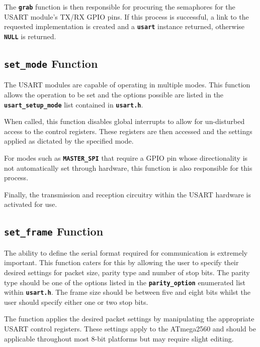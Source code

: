 \documentclass[a4paper, oneside, 11pt, titlepage, onecolumn, openright]{report}
\begin{document}
{{			The \textbf{\texttt{grab}} function is then responsible for procuring the semaphores for the USART module's TX/RX GPIO pins. If this process is successful, a link to the requested implementation is created and a \textbf{\texttt{usart}} instance returned, otherwise \textbf{\texttt{NULL}} is returned.
			
\subsection{\textbf{\texttt{set\_mode}} Function}
			\label{ss:HALusartset_modeFunction}	
			
			The USART modules are capable of operating in multiple modes. This function allows the operation to be set and the options possible are listed in the \textbf{\texttt{usart\_setup\_mode}} list contained in \textbf{\texttt{usart.h}}.
			
			When called, this function disables global interrupts to allow for un-disturbed access to the control registers. These registers are then accessed and the settings applied as dictated by the specified mode.
			
			For modes such as \textbf{\texttt{MASTER\_SPI}} that require a GPIO pin whose directionality is not automatically set through hardware, this function is also responsible for this process.
			
			Finally, the transmission and reception circuitry within the USART hardware is activated for use.
			
\subsection{\textbf{\texttt{set\_frame}} Function}
			\label{ss:HALusartset_frameFunction}
			
			The ability to define the serial format required for communication is extremely important. This function caters for this by allowing the user to specify their desired settings for packet size, parity type and number of stop bits. The parity type should be one of the options listed in the \textbf{\texttt{parity\_option}} enumerated list within \textbf{\texttt{usart.h}}. The frame size should be between five and eight bits whilst the user should specify either one or two stop bits.
			
			The function applies the desired packet settings by manipulating the appropriate USART control registers. These settings apply to the ATmega2560 and should be applicable throughout most 8-bit platforms but may require slight editing.
			
}}
\end{document}
